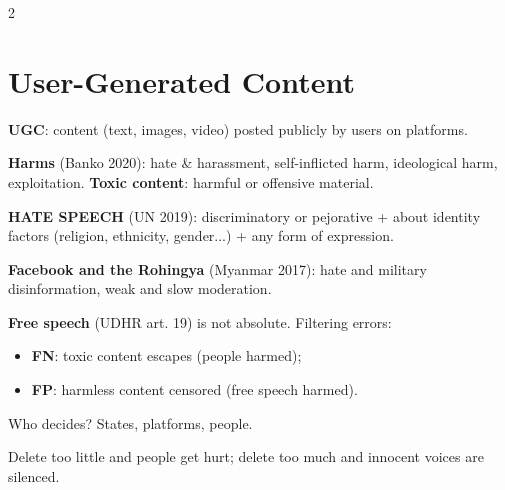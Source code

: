 \documentclass[a4paper,9pt]{extarticle}
\begin{document}
\begin{multicols}{2}
\section{User-Generated Content}


\begin{definition}

\textbf{UGC}: content (text, images, video) posted publicly by users on platforms.

\textbf{Harms} (Banko 2020): hate \& harassment, self-inflicted harm, ideological harm,
exploitation. \textbf{Toxic content}: harmful or offensive material.

\end{definition}


\begin{definition}

\textbf{HATE SPEECH} (UN 2019): discriminatory or pejorative + about identity factors
(religion, ethnicity, gender...) + any form of expression.

\end{definition}


\begin{example}

\textbf{Facebook and the Rohingya} (Myanmar 2017): hate and military disinformation, weak and
slow moderation.

\end{example}


\begin{important}

\textbf{Free speech} (UDHR art. 19) is not absolute. Filtering errors:

\begin{itemize}

\item \textbf{FN}: toxic content escapes (people harmed);

\item \textbf{FP}: harmless content censored (free speech harmed).

\end{itemize}

Who decides? States, platforms, people.

\end{important}


\begin{goat}

Delete too little and people get hurt; delete too much and innocent voices are silenced.

\end{goat}




\end{multicols}
\end{document}
